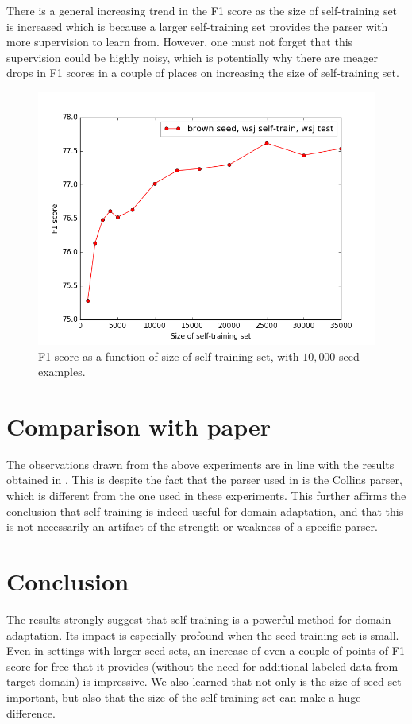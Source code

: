 \documentclass{sig-alternate-05-2015}
\begin{document}
There is a general increasing trend in the F1 score as the size of self-training set is increased which is because a larger self-training set provides the parser with more supervision to learn from. However, one must not forget that this supervision could be highly noisy, which is potentially why there are meager drops in F1 scores in a couple of places on increasing the size of self-training set.

\begin{figure}
\centering
\includegraphics[width=0.95\columnwidth]{figs/fig-4-self}
\caption{F1 score as a function of size of self-training set, with $10,000$ seed examples.}
\label{fig:4-self}
\end{figure}

\section{Comparison with paper}
The observations drawn from the above experiments are in line with the results obtained in \cite{reichart2007self}. This is despite the fact that the parser used in \cite{reichart2007self} is the Collins parser, which is different from the one used in these experiments. This further affirms the conclusion that self-training is indeed useful for domain adaptation, and that this is not necessarily an artifact of the strength or weakness of a specific parser.

\section{Conclusion}
The results strongly suggest that self-training is a powerful method for domain adaptation. Its impact is especially profound when the seed training set is small. Even in settings with larger seed sets, an increase of even a couple of points of F1 score for free that it provides (without the need for additional labeled data from target domain) is impressive. We also learned that not only is the size of seed set important, but also that the size of the self-training set can make a huge difference.



\end{document}
